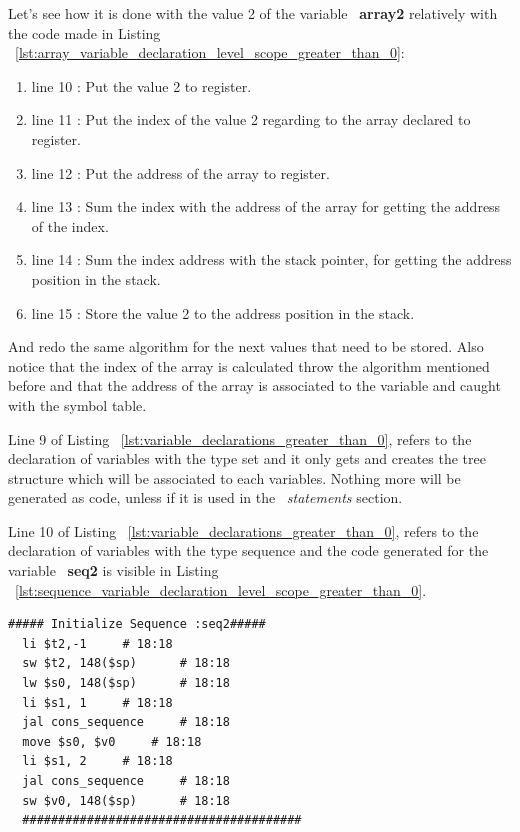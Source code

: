\documentclass[
  oneside,
  11pt, a4paper,
  footinclude=true,
  headinclude=true,
  cleardoublepage=empty
]{scrbook}
\begin{document}
Let's see how it is done with the value 2 of the variable ~\textbf{array2} relatively with the code made in Listing ~\ref{lst:array_variable_declaration_level_scope_greater_than_0}:

\begin{enumerate}
\item line 10 : Put the value 2 to register.
\item line 11 : Put the index of the value 2 regarding to the array declared to register.
\item line 12 : Put the address of the array to register.
\item line 13 : Sum the index with the address of the array for getting the address of the index.
\item line 14 : Sum the index address with the stack pointer, for getting the address position in the stack.
\item line 15 : Store the value 2 to the address position in the stack.
\end{enumerate}

And redo the same algorithm for the next values that need to be stored. Also notice that the index of the array is calculated throw the algorithm mentioned before and that the address of the array is associated to the variable and caught with the symbol table.

Line 9 of Listing ~\ref{lst:variable_declarations_greater_than_0}, refers to the declaration of variables with the type set and it only gets and creates the tree structure which will be associated to each variables. Nothing more will be generated as code, unless if it is used in the ~\textit{statements} section.

Line 10 of Listing ~\ref{lst:variable_declarations_greater_than_0}, refers to the declaration of variables with the type sequence and the code generated for the variable ~\textbf{seq2} is visible in Listing ~\ref{lst:sequence_variable_declaration_level_scope_greater_than_0}.

\begin{lstlisting}[caption={Declaring sequence variable in level scope greater than 0},label={lst:sequence_variable_declaration_level_scope_greater_than_0}]
  ##### Initialize Sequence :seq2#####
  li $t2,-1		# 18:18
  sw $t2, 148($sp)		# 18:18
  lw $s0, 148($sp)		# 18:18
  li $s1, 1		# 18:18
  jal cons_sequence		# 18:18
  move $s0, $v0		# 18:18
  li $s1, 2		# 18:18
  jal cons_sequence		# 18:18
  sw $v0, 148($sp)		# 18:18
  #######################################
\end{lstlisting}
\end{document}
